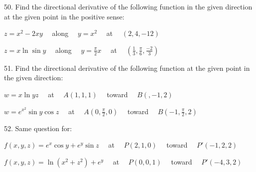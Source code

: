 \documentclass[11pt]{amsbook}
\begin{document}
\begin{hEnumerateArabic}
    \item[50.] Find the directional derivative of the following function in the given direction at the given point in the positive sense:
    \begin{hEnumerateAlpha}
        \item $z = x^{2} - 2xy \quad $ along $ \quad y = x^{2} \quad $ at $ \quad (2, 4, -12)$
        \item $z = x\ln{\sin{y}} \quad $ along $ \quad y = \frac{\pi}{2}x \quad $ at $ \quad (\frac{1}{3}, \frac{\pi}{6}, \frac{-2}{3})$
    \end{hEnumerateAlpha}
    
    \item[51.] Find the directional derivative of the following function at the given point in the given direction:
    \begin{hEnumerateAlpha}
        \item $w = x\ln{yz} \quad $ at $ \quad A(1, 1, 1) \quad $ toward $ \quad B(, -1, 2)$
        \item $w = e^{x^{2}}\sin{y}\cos{z} \quad $ at $ \quad A(0, \frac{\pi}{2}, 0) \quad $ toward $ \quad B(-1, \frac{\pi}{2}, 2)$
    \end{hEnumerateAlpha}
    
    \item[52.] Same question for:
    \begin{hEnumerateAlpha}
        \item $f (x, y, z) = e^{x}\cos{y} + e^{y}\sin{z} \quad $ at $ \quad P(2, 1, 0) \quad $ toward $ \quad P'(-1, 2, 2)$
        \item $f (x, y, z) = \ln{(x^{2} + z^{2})} + e^{y} \quad $ at $ \quad P(0, 0, 1) \quad $ toward $ \quad P'(-4, 3, 2)$
    \end{hEnumerateAlpha}

\end{hEnumerateArabic}
\end{document}
